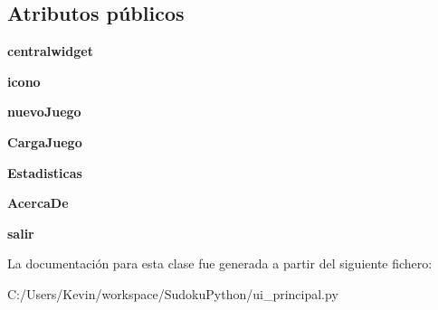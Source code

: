 \subsection*{Atributos públicos}
\begin{DoxyCompactItemize}
\item 
{\bfseries centralwidget}\label{classui__principal_1_1_ui__principal_af21a1516c73bfcf451a6bf5fc4267cde}

\item 
{\bfseries icono}\label{classui__principal_1_1_ui__principal_ab41ca5097a5f9d7994c246743c3bd6cb}

\item 
{\bfseries nuevo\-Juego}\label{classui__principal_1_1_ui__principal_ab924923db289b965cb96f702071e066b}

\item 
{\bfseries Carga\-Juego}\label{classui__principal_1_1_ui__principal_a6bc72e32d75a52caafc5ef425eea6559}

\item 
{\bfseries Estadisticas}\label{classui__principal_1_1_ui__principal_aab0480c82cd2d6a0a583781e0501bca0}

\item 
{\bfseries Acerca\-De}\label{classui__principal_1_1_ui__principal_abdea197d8a5851d76ed8108e403ec5b4}

\item 
{\bfseries salir}\label{classui__principal_1_1_ui__principal_a9666b8d6411b41d93fad07e1c610ff79}

\end{DoxyCompactItemize}


La documentación para esta clase fue generada a partir del siguiente fichero\-:\begin{DoxyCompactItemize}
\item 
C\-:/\-Users/\-Kevin/workspace/\-Sudoku\-Python/ui\-\_\-principal.\-py\end{DoxyCompactItemize}
